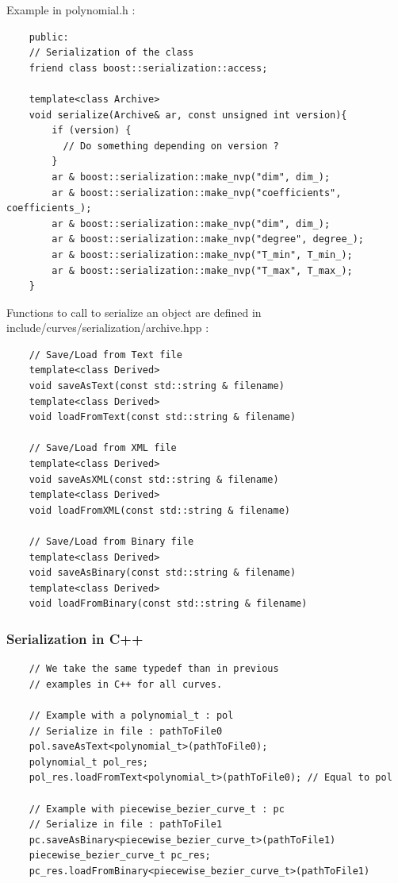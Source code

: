 \documentclass{article}
\begin{document}
    Example in polynomial.h :
    \begin{lstlisting}
    public:
    // Serialization of the class
    friend class boost::serialization::access;
    
    template<class Archive>
    void serialize(Archive& ar, const unsigned int version){
        if (version) {
          // Do something depending on version ?
        }
        ar & boost::serialization::make_nvp("dim", dim_);
        ar & boost::serialization::make_nvp("coefficients", coefficients_);
        ar & boost::serialization::make_nvp("dim", dim_);
        ar & boost::serialization::make_nvp("degree", degree_);
        ar & boost::serialization::make_nvp("T_min", T_min_);
        ar & boost::serialization::make_nvp("T_max", T_max_);
    }
    \end{lstlisting}
    
    Functions to call to serialize an object are defined in include/curves/serialization/archive.hpp :
    \begin{lstlisting}
    // Save/Load from Text file
    template<class Derived>
    void saveAsText(const std::string & filename)
    template<class Derived>
    void loadFromText(const std::string & filename)
    
    // Save/Load from XML file
    template<class Derived>
    void saveAsXML(const std::string & filename)
    template<class Derived>
    void loadFromXML(const std::string & filename)
    
    // Save/Load from Binary file
    template<class Derived>
    void saveAsBinary(const std::string & filename)
    template<class Derived>
    void loadFromBinary(const std::string & filename)
    \end{lstlisting}

    \subsubsection{Serialization in C++}
    \begin{lstlisting}
    // We take the same typedef than in previous
    // examples in C++ for all curves.
    
    // Example with a polynomial_t : pol
    // Serialize in file : pathToFile0
    pol.saveAsText<polynomial_t>(pathToFile0);
    polynomial_t pol_res;
    pol_res.loadFromText<polynomial_t>(pathToFile0); // Equal to pol
    
    // Example with piecewise_bezier_curve_t : pc
    // Serialize in file : pathToFile1
    pc.saveAsBinary<piecewise_bezier_curve_t>(pathToFile1)
    piecewise_bezier_curve_t pc_res;
    pc_res.loadFromBinary<piecewise_bezier_curve_t>(pathToFile1)
    \end{lstlisting}
    
\end{document}

